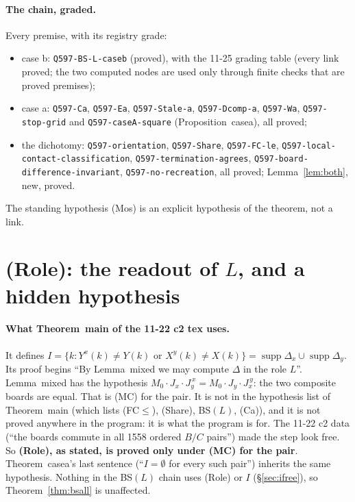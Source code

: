 \documentclass[11pt]{article}
\theoremstyle{definition}\newtheorem{definition}[theorem]{Definition}\newtheorem{remark}[theorem]{Remark}
\begin{document}
\paragraph{The chain, graded.} Every premise, with its registry grade:
\begin{itemize}
\item case b: \texttt{Q597-BS-L-caseb} (proved), with the 11-25 grading table (every link proved; the two computed nodes are used only through finite checks that are proved premises);
\item case a: \texttt{Q597-Ca}, \texttt{Q597-Ea}, \texttt{Q597-Stale-a}, \texttt{Q597-Dcomp-a}, \texttt{Q597-Wa}, \texttt{Q597-stop-grid} and \texttt{Q597-caseA-square} (Proposition~casea), all proved;
\item the dichotomy: \texttt{Q597-orientation}, \texttt{Q597-Share}, \texttt{Q597-FC-le}, \texttt{Q597-local-contact-classification}, \texttt{Q597-termination-agrees}, \texttt{Q597-board-difference-invariant}, \texttt{Q597-no-recreation}, all proved; Lemma~\ref{lem:both}, new, proved.
\end{itemize}
The standing hypothesis (Mos) is an explicit hypothesis of the theorem, not a link.

\section{(Role): the readout of $L$, and a hidden hypothesis}\label{sec:role}
\paragraph{What Theorem~main of the 11-22 c2 tex uses.} It defines $I=\{k:Y^x(k)\ne Y(k)\text{ or }X^y(k)\ne X(k)\}=\operatorname{supp}\Delta_x\cup\operatorname{supp}\Delta_y$. Its proof begins ``By Lemma~mixed we may compute $\Delta$ in the role $L$''. Lemma~mixed has the hypothesis $M_0\cdot J_x\cdot J_y^{\,x}=M_0\cdot J_y\cdot J_x^{\,y}$: the two composite boards are equal. That is (MC) for the pair. It is not in the hypothesis list of Theorem~main (which lists (FC$\le$), (Share), BS$(L)$, (Ca)), and it is not proved anywhere in the program: it is what the program is for. The 11-22 c2 data (``the boards commute in all 1558 ordered $B/C$ pairs'') made the step look free. So \textbf{(Role), as stated, is proved only under (MC) for the pair}. Theorem~casea's last sentence (``$I=\emptyset$ for every such pair'') inherits the same hypothesis. Nothing in the BS$(L)$ chain uses (Role) or $I$ (\S\ref{sec:ifree}), so Theorem~\ref{thm:bsall} is unaffected.
\end{document}
